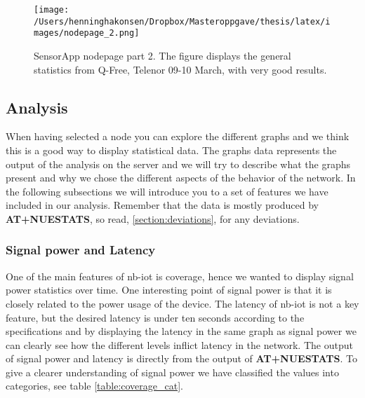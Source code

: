 \documentclass[USenglish]{ifimaster}  %
\begin{document}
\begin{figure}[H]
  \centering
  \texttt{[image: /Users/henninghakonsen/Dropbox/Masteroppgave/thesis/latex/images/nodepage\_2.png]}
  \caption[SensorApp nodepage part 2]{SensorApp nodepage part 2. The figure displays the general statistics from Q-Free, Telenor 09-10 March, with very good results.}
  \label{pic:nodepage2}
\end{figure}

\subsection{Analysis} \label{ssection:analysis}
When having selected a node you can explore the different graphs and we think this is a good way to display statistical data. The graphs data represents the output of the analysis on the server and we will try to describe what the graphs present and why we chose the different aspects of the behavior of the network.
In the following subsections we will introduce you to a set of features we have included in our analysis. Remember that the data is mostly produced by \textbf{AT+NUESTATS}, so read, \vref{section:deviations}, for any deviations.

\subsubsection{Signal power and Latency}
One of the main features of \acrshort{nb-iot} is coverage, hence we wanted to display signal power statistics over time. One interesting point of signal power is that it is closely related to the power usage of the device. The latency of \acrshort{nb-iot} is not a key feature, but the desired latency is under ten seconds according to the specifications\cite{datasheet:ubloxchip} and by displaying the latency in the same graph as signal power we can clearly see how the different levels inflict latency in the network. The output of signal power and latency is directly from the output of \textbf{AT+NUESTATS}. To give a clearer understanding of signal power we have classified the values into categories, see table \vref{table:coverage_cat}.

\begin{table}[H]
\centering
{}
\caption{Signal power categories}
\label{table:coverage_cat}
\end{table}
\end{document}

